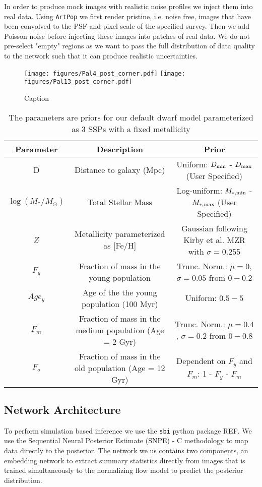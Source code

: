 \documentclass[twocolumn]{aastex631}
\newcommand{\artpop}[0]{\texttt{ArtPop}}
\newcommand{\sbi}[0]{\texttt{sbi}}
\begin{document}
In order to produce mock images with realistic noise profiles we inject them into real data. Using \artpop{} we first render pristine, i.e. noise free, images that have been convolved to the PSF and pixel scale of the specified survey. Then we add Poisson noise before injecting these images into patches of real data. We do not pre-select "empty" regions as we want to pass the full distribution of data quality to the network such that it can produce realistic uncertainties.
\begin{figure*}
    \centering
    \texttt{[image: figures/Pal4\_post\_corner.pdf]}
    \texttt{[image: figures/Pal13\_post\_corner.pdf]}
    \caption{Caption}
    \label{fig:Pal4}
\end{figure*}

\begin{table*}
    \centering
    \caption{The parameters are priors for our default dwarf model parameterized as 3 SSPs with a fixed metallicity}
    \small
    \begin{tabular}{c c c} 
        Parameter & Description & Prior \\  \hline \hline
         D & Distance to galaxy (Mpc) & Uniform: $D_{\rm min}$ -  $D_{\rm max}$ (User Specified) \\
         $\log (M_*/M_\odot)$ & Total Stellar Mass & Log-uniform: $M_{\rm*, min}$ -  $M_{\rm* , max}$ (User Specified) \\
         $Z$ & Metallicity parameterized as [Fe/H] & Gaussian following Kirby et al. MZR with $\sigma = 0.255$ \\
         $F_{y}$& Fraction of mass in the young population & Trunc. Norm.: $\mu=0$, $\sigma=0.05$ from $0-0.2$\\
         $Age_{y}$& Age of the the young population (100 Myr) & Uniform: $0.5-5$\\
         $F_{m}$& Fraction of mass in the medium population (Age = 2 Gyr) & Trunc. Norm.: $\mu=0.4$, $\sigma=0.2$ from $0-0.8$\\
         $F_{o}$& Fraction of mass in the old population (Age = 12 Gyr) & Dependent on $F_{y}$ and $F_{m}$: 1 - $F_{y}$ - $F_{m}$\\ \hline  
    \end{tabular}
    \label{tab:dwarf_model}
\end{table*}

\subsection{Network Architecture}
\label{sec:NN}
To perform simulation based inference we use the \sbi{} python package {REF}. We use the Sequential Neural Posterior Estimate (SNPE) - C methodology to map data directly to the posterior. The network we us contains two components, an embedding network to extract summary statistics directly from images that is trained simultaneously to the normalizing flow model to predict the posterior distribution. 
\end{document}
